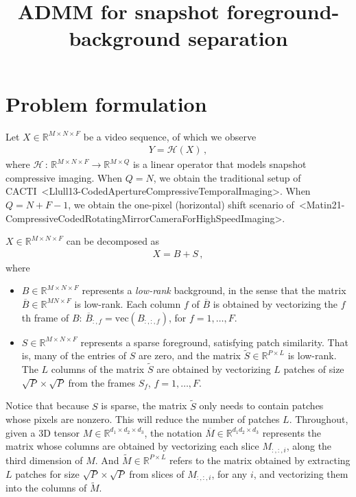 \documentclass[a4paper,11pt]{article}
\title{ADMM for snapshot foreground-background separation}
\author{}
\date{}
\def\cite#1{<#1>}%
\begin{document}
\maketitle

\section{Problem formulation}

Let $X \in \mathbb{R}^{M\times N \times F}$ be a video sequence, of which
we observe
\begin{align}
  \label{eq:measurement}
  Y = \mathcal{H}(X)\,,
\end{align}
where $\mathcal{H}\,:\, \mathbb{R}^{M \times N \times F} \to \mathbb{R}^{M
\times Q}$ is a linear operator that models snapshot compressive imaging. When
$Q = N$, we obtain the traditional setup of
CACTI~\cite{Llull13-CodedApertureCompressiveTemporalImaging}. When $Q = N + F
-1$, we obtain the one-pixel (horizontal) shift scenario
of~\cite{Matin21-CompressiveCodedRotatingMirrorCameraForHighSpeedImaging}. 

\begin{Assumption}
  $X \in \mathbb{R}^{M \times N\times F}$ can be decomposed as
  \begin{align}
    \label{eq:assumptionlowrankplussparse}
    X = B + S\,,
  \end{align}
  where 
  \begin{itemize}
    \item $B \in \mathbb{R}^{M\times N\times F}$ represents a
      \textit{low-rank} background, in the sense that the matrix
      $\overline{B} \in \mathbb{R}^{MN \times F}$ is low-rank. Each column $f$
      of $\overline{B}$ is obtained by vectorizing the $f$th frame of
      $B$: $\overline{B}_{:, f} = \text{vec}(B_{:, :, f})$, for $f
      = 1,\ldots, F$.

    \item $S \in \mathbb{R}^{M\times N\times F}$ represents a sparse
    foreground, satisfying patch similarity. That is, many of the entries of
    $S$ are zero, and the matrix $\widetilde{S} \in \mathbb{R}^{P
    \times L}$ is low-rank. The $L$ columns of the matrix $\widetilde{S}$ are obtained by
    vectorizing $L$ patches of size $\sqrt{P}\times \sqrt{P}$ from the frames
    $S_f$, $f = 1, \ldots, F$. 
  \end{itemize}
\end{Assumption}

Notice that because $S$ is sparse, the matrix $\widetilde{S}$ only needs to
contain patches whose pixels are nonzero. This will reduce the number of
patches $L$. Throughout, given a 3D tensor $M \in \mathbb{R}^{d_1 \times d_2
\times d_{3}}$, the notation $\overline{M} \in \mathbb{R}^{d_1 d_2 \times d_3}$
represents the matrix whose columns are obtained by vectorizing each slice
$M_{:, :, i}$, along the third dimension of $M$. And $\widetilde{M} \in
\mathbb{R}^{P \times L}$ refers to the matrix obtained by extracting $L$
patches for size $\sqrt{P} \times \sqrt{P}$ from slices of $M_{:, :, i}$, for
any $i$, and vectorizing them into the columns of $\widetilde{M}$. 
\end{document}
